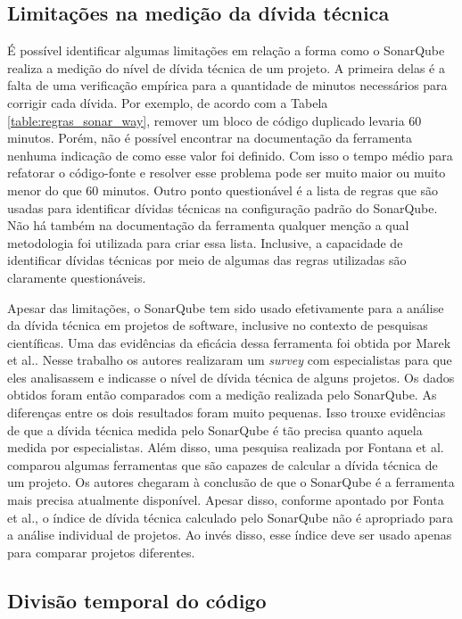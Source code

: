 \subsection{Limitações na medição da dívida técnica}


É possível identificar algumas limitações em relação a forma como o SonarQube realiza a medição do nível de dívida técnica de um projeto. A primeira delas é a falta de uma verificação empírica para a quantidade de minutos necessários para corrigir cada dívida. Por exemplo, de acordo com a Tabela \ref{table:regras_sonar_way}, remover um bloco de código duplicado levaria 60 minutos. Porém, não é possível encontrar na documentação da ferramenta nenhuma indicação de como esse valor foi definido. Com isso o tempo médio para refatorar o código-fonte e resolver esse problema pode ser muito maior ou muito menor do que 60 minutos. Outro ponto questionável é a lista de regras que são usadas para identificar dívidas técnicas na configuração padrão do SonarQube. Não há também na documentação da ferramenta qualquer menção a qual metodologia foi utilizada para criar essa lista. Inclusive, a capacidade de identificar dívidas técnicas por meio de algumas das regras utilizadas são claramente questionáveis. 

Apesar das limitações, o SonarQube tem sido usado efetivamente para a análise da dívida técnica em projetos de software, inclusive no contexto de pesquisas científicas. Uma das evidências da eficácia dessa ferramenta foi obtida por Marek et al.\cite{stochel2012value}. Nesse trabalho os autores realizaram um \textit{survey} com especialistas para que eles analisassem e indicasse o nível de dívida técnica de alguns projetos. Os dados obtidos foram então comparados com a medição realizada pelo SonarQube. As diferenças entre os dois resultados foram muito pequenas. Isso trouxe evidências de que a dívida técnica medida pelo SonarQube é tão precisa quanto aquela medida por especialistas.  Além disso, uma pesquisa realizada por Fontana et al.\cite{fontana2016tool} comparou algumas ferramentas que são capazes de calcular a dívida técnica de um projeto. Os autores chegaram à conclusão de que o SonarQube é a ferramenta mais precisa atualmente disponível. Apesar disso, conforme apontado por Fonta et al.\cite{fontana2016technical}, o índice de dívida técnica calculado pelo SonarQube não é apropriado para a análise individual de projetos. Ao invés disso, esse índice deve ser usado apenas para comparar projetos diferentes.  

\subsection{Divisão temporal do código}
\label{cap_experimento_divisao_temporal}
 
